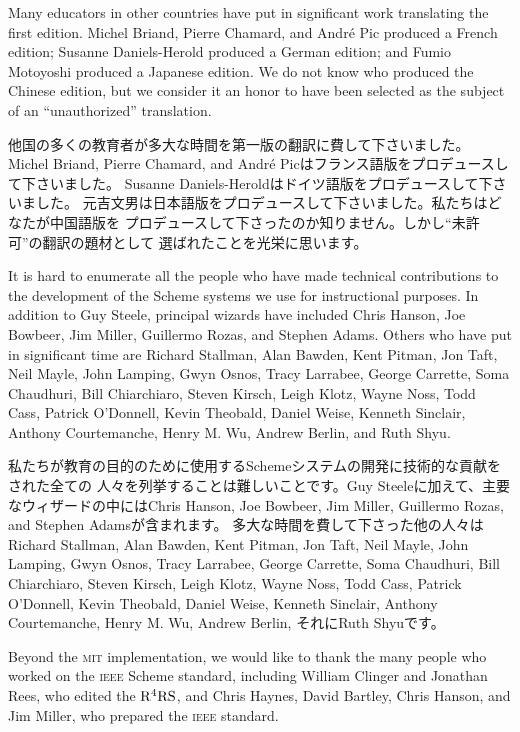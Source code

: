 \documentclass[oneside]{book}
\newcommand{\acronym}[1]{\textsc{\MakeLowercase{#1}}}
\begin{document}
Many educators in other countries have put in significant work translating the
first edition.  Michel Briand, Pierre Chamard, and Andr\'e Pic produced a
French edition; Susanne Daniels-Herold produced a German edition; and Fumio
Motoyoshi produced a Japanese edition.  We do not know who produced the Chinese
edition, but we consider it an honor to have been selected as the subject of an
``unauthorized'' translation.

他国の多くの教育者が多大な時間を第一版の翻訳に費して下さいました。
Michel Briand, Pierre Chamard, and Andr\'e Picはフランス語版をプロデュースして下さいました。
Susanne Daniels-Heroldはドイツ語版をプロデュースして下さいました。
元吉文男は日本語版をプロデュースして下さいました。私たちはどなたが中国語版を
プロデュースして下さったのか知りません。しかし``未許可''の翻訳の題材として
選ばれたことを光栄に思います。

It is hard to enumerate all the people who have made technical contributions to
the development of the Scheme systems we use for instructional purposes.  In
addition to Guy Steele, principal wizards have included Chris Hanson, Joe
Bowbeer, Jim Miller, Guillermo Rozas, and Stephen Adams.  Others who have put
in significant time are Richard Stallman, Alan Bawden, Kent Pitman, Jon Taft,
Neil Mayle, John Lamping, Gwyn Osnos, Tracy Larrabee, George Carrette, Soma
Chaudhuri, Bill Chiarchiaro, Steven Kirsch, Leigh Klotz, Wayne Noss, Todd Cass,
Patrick O'Donnell, Kevin Theobald, Daniel Weise, Kenneth Sinclair, Anthony
Courtemanche, Henry M. Wu, Andrew Berlin, and Ruth Shyu.

私たちが教育の目的のために使用するSchemeシステムの開発に技術的な貢献をされた全ての
人々を列挙することは難しいことです。Guy Steeleに加えて、主要なウィザードの中にはChris Hanson, Joe
Bowbeer, Jim Miller, Guillermo Rozas, and Stephen Adamsが含まれます。
多大な時間を費して下さった他の人々はRichard Stallman, Alan Bawden, Kent Pitman, Jon Taft,
Neil Mayle, John Lamping, Gwyn Osnos, Tracy Larrabee, George Carrette, Soma
Chaudhuri, Bill Chiarchiaro, Steven Kirsch, Leigh Klotz, Wayne Noss, Todd Cass,
Patrick O'Donnell, Kevin Theobald, Daniel Weise, Kenneth Sinclair, Anthony
Courtemanche, Henry M. Wu, Andrew Berlin, それにRuth Shyuです。

Beyond the \acronym{MIT} implementation, we would like to thank the many people
who worked on the \acronym{IEEE} Scheme standard, including William Clinger and
Jonathan Rees, who edited the \( \rm R^4RS \), and Chris Haynes, David Bartley,
Chris Hanson, and Jim Miller, who prepared the \acronym{IEEE} standard.
\end{document}
